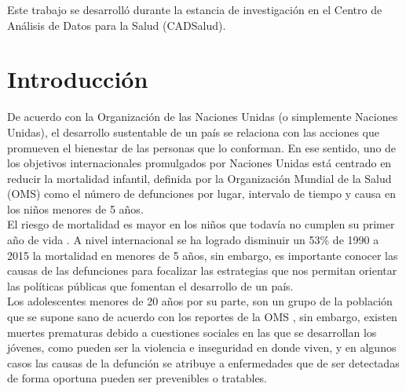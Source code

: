\documentclass[11pt, oneside]{book}
\begin{document}
Este trabajo se desarrolló durante la estancia de investigación en el Centro de Análisis de Datos para la Salud (CADSalud).

\let\cleardoublepage\clearpage
\tableofcontents


\mainmatter %
\pagestyle{headings}


\let\cleardoublepage\clearpage
\chapter{Introducción}
De acuerdo con la Organización de las Naciones Unidas (o simplemente Naciones Unidas), el desarrollo sustentable de un país se relaciona con las acciones que promueven el bienestar de las personas que lo conforman. En ese sentido, uno de los objetivos internacionales promulgados por Naciones Unidas está centrado en reducir la mortalidad infantil, definida por la Organización Mundial de la Salud (OMS) como el número de defunciones por lugar, intervalo de tiempo y causa en los niños menores de 5 años.\\

El riesgo de mortalidad es mayor en los niños que todavía no cumplen su primer año de vida \cite{OMS1}. A nivel internacional se ha logrado disminuir un 53\% de 1990 a 2015 la mortalidad en menores de 5 años, sin embargo, es importante conocer las causas de las defunciones para focalizar las estrategias que nos permitan orientar las políticas públicas que fomentan el desarrollo de un país.\\

Los adolescentes menores de 20 años por su parte, son un grupo de la población que se supone sano de acuerdo con los reportes de la OMS \cite{OMS2}, sin embargo, existen muertes prematuras debido a cuestiones sociales en las que se desarrollan los jóvenes, como pueden ser la violencia e inseguridad en donde viven, y en algunos casos las causas de la defunción se atribuye a enfermedades que de ser detectadas de forma oportuna pueden ser prevenibles o tratables.\\
\end{document}
